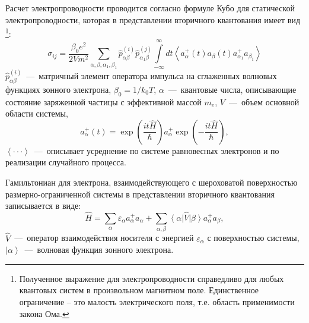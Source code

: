 Расчет электропроводности проводится согласно формуле Кубо \cite{Kubo1957a} для статической электропроводности, которая в представлении вторичного квантования имеет вид \footnote{ Полученное выражение для электропроводности справедливо для любых квантовых систем в произвольном магнитном поле. Единственное ограничение -- это малость электрического поля, т.е. область применимости закона Ома.}:
\begin{equation} \label{eq:31_10}
\sigma _{ij} =\frac{\beta_0 e^2 }{2 V m^2 } \sum _{\alpha,\beta, \alpha_1,\beta_1} \hat{p}_{\alpha \beta }^{(i)} \hat{p}_{\alpha_1 \beta }^{(j)} \int\limits_{-\infty }^{\infty} {dt\left\langle a_{\alpha }^+ (t) a_{\beta }(t) a_{\alpha_1 }^+ a_{\beta_1 } \right\rangle}
\end{equation} 
$\hat{p}_{\alpha \beta }^{(i)} $~---~матричный элемент оператора импульса на сглаженных волновых функциях зонного электрона, $\beta_0 = 1/k_0 T$, $\alpha $~---~квантовые числа, описывающие состояние заряженной частицы с эффективной массой $m_e$, $V$~---~объем основной области системы,
\[
a_{\alpha }^+ (t)= \exp\left(\frac{it\hat{H}}{\hbar } \right)a_{\alpha }^+ \exp\left(-\frac{it\hat{H}}{\hbar } \right),
\] 
$\left\langle \cdot \cdot \cdot \right\rangle $~---~описывает усреднение по системе равновесных электронов и по реализации случайного процесса.

Гамильтониан для электрона, взаимодействующего с шероховатой поверхностью размерно-ограниченной системы в представлении вторичного квантования записывается в виде:
\begin{equation} \label{eq:31_20}
\hat{H}=\sum _{\alpha }\varepsilon _{\alpha } a_{\alpha }^{+} a_{\alpha } +\sum _{\alpha ,\beta }{\left\langle \alpha  \right|} \hat{V}{\left| \beta  \right\rangle} a_{\alpha }^{+} a_{\beta }, 
\end{equation}
$\hat{V}$~---~оператор взаимодействия носителя с энергией $\varepsilon _{\alpha } $ с поверхностью системы, ${\left| \alpha  \right\rangle} $~---~волновая функция зонного электрона.

